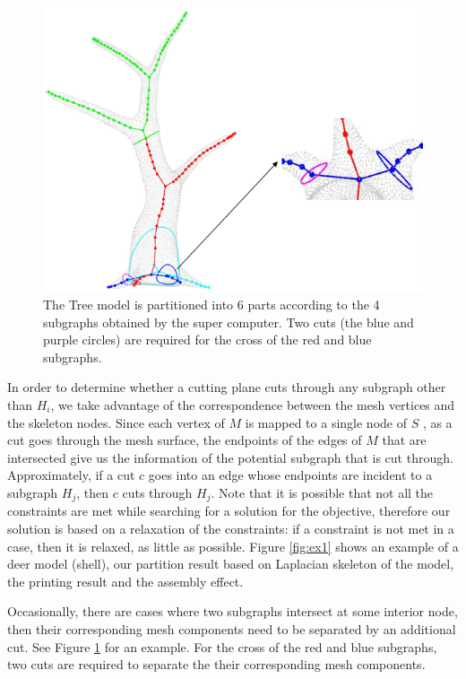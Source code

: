 \begin{figure}[t!]
  \centering
  \includegraphics[width=0.8\linewidth]{figs/super_tree.png}
  \caption{\label{fig:super_tree}%
  The Tree model is partitioned into 6 parts according to the 4 subgraphs obtained by the super computer. Two cuts {\color{blue}(the blue and purple circles)} are required for the cross of the red and blue subgraphs.}
\end{figure}

In order to determine whether a cutting plane cuts through any subgraph other than $H_i$, we take advantage of the correspondence between the mesh vertices and the skeleton nodes. Since each vertex of $M$ is mapped to a single node of $S$ \cite{AuTCCL08}, as a cut goes through the mesh surface, the endpoints of the edges of $M$ that are intersected give us the information of the potential subgraph that is cut through. Approximately, if a cut $c$ goes into an edge whose endpoints are incident to a subgraph $H_j$, then $c$ cuts through $H_j$. Note that it is possible that not all the constraints are met while searching for a solution for the objective, therefore our solution is based on a relaxation of the constraints: if a constraint is not met in a case, then it is relaxed, as little as possible. Figure \ref{fig:ex1} shows an example of a deer model (shell), our partition result based on Laplacian skeleton of the model, the printing result and the assembly effect.

{ {Occasionally, there are cases where two subgraphs intersect at some interior node, then their corresponding mesh components need to be separated by an additional cut.} {See Figure \ref{fig:super_tree} for an example. For the cross of the red and blue subgraphs, two cuts are required to separate the their corresponding mesh components. }}

